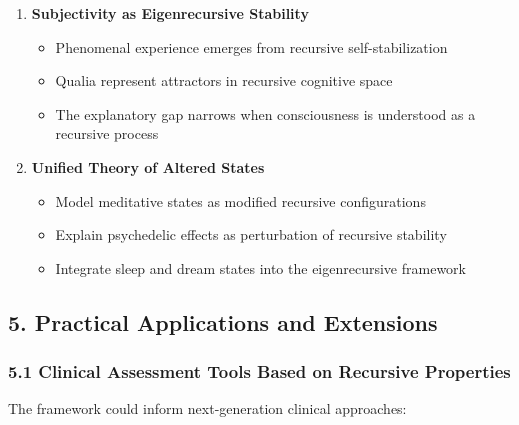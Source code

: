 \documentclass[
]{article}
\providecommand{\tightlist}{%
  \setlength{\itemsep}{0pt}\setlength{\parskip}{0pt}}
\begin{document}
\begin{enumerate}
\def\labelenumi{\arabic{enumi}.}
\tightlist
\item
  \textbf{Subjectivity as Eigenrecursive Stability}

  \begin{itemize}
  \tightlist
  \item
    Phenomenal experience emerges from recursive self-stabilization
  \item
    Qualia represent attractors in recursive cognitive space
  \item
    The explanatory gap narrows when consciousness is understood as a
    recursive process
  \end{itemize}
\item
  \textbf{Unified Theory of Altered States}

  \begin{itemize}
  \tightlist
  \item
    Model meditative states as modified recursive configurations
  \item
    Explain psychedelic effects as perturbation of recursive stability
  \item
    Integrate sleep and dream states into the eigenrecursive framework
  \end{itemize}
\end{enumerate}

\subsection{5. Practical Applications and
Extensions}\label{practical-applications-and-extensions}

\subsubsection{5.1 Clinical Assessment Tools Based on Recursive
Properties}\label{clinical-assessment-tools-based-on-recursive-properties}

The framework could inform next-generation clinical approaches:
\end{document}
